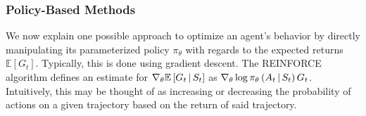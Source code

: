 \subsubsection{Policy-Based Methods}
We now explain one possible approach to optimize an agent's behavior by directly manipulating its parameterized policy $\pi_\theta$ with regards to the expected returns $\mathbb{E}\left[G_t\right]$. Typically, this is done using gradient descent. The REINFORCE algorithm \cite{reinforce} defines an estimate for $\nabla_\theta \mathbb{E}\left[G_t \,\middle|\, S_t \right]$ as $\nabla_\theta \log \pi_\theta\left(A_t \,\middle|\, S_t\right) G_t$. Intuitively, this may be thought of as increasing or decreasing the probability of actions on a given trajectory based on the return of said trajectory.